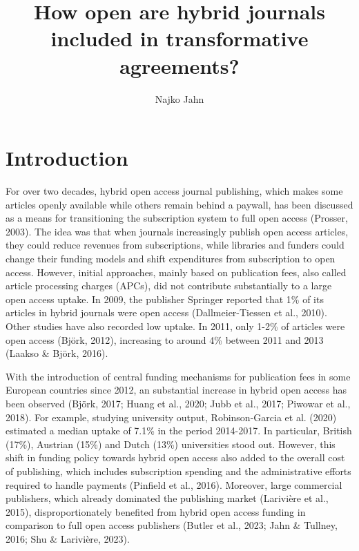 \documentclass[a4paper,man,floatsintext,longtable,noextraspace,12pt]{apa6}
\title{\textbf{How open are hybrid journals included in transformative agreements?}}
\author{Najko Jahn}
\affiliation{Göttingen State and University Library, University of Göttingen\\
Platz der Göttinger Sieben 1, 37073 Göttingen, Germany\\
najko.jahn@sub.uni-goettingen.de
}
\begin{document}
\maketitle

\setcounter{secnumdepth}{2}

\hypertarget{introduction}{%
\section{Introduction}\label{introduction}}

For over two decades, hybrid open access journal publishing, which makes
some articles openly available while others remain behind a paywall, has
been discussed as a means for transitioning the subscription system to
full open access (Prosser, 2003). The idea was that when journals
increasingly publish open access articles, they could reduce revenues
from subscriptions, while libraries and funders could change their
funding models and shift expenditures from subscription to open access.
However, initial approaches, mainly based on publication fees, also
called article processing charges (APCs), did not contribute
substantially to a large open access uptake. In 2009, the publisher
Springer reported that 1\% of its articles in hybrid journals were open
access (Dallmeier-Tiessen et al., 2010). Other studies have also
recorded low uptake. In 2011, only 1-2\% of articles were open access
(Björk, 2012), increasing to around 4\% between 2011 and 2013 (Laakso \&
Björk, 2016).

With the introduction of central funding mechanisms for publication fees
in some European countries since 2012, an substantial increase in hybrid
open access has been observed (Björk, 2017; Huang et al., 2020; Jubb et
al., 2017; Piwowar et al., 2018). For example, studying university
output, Robinson-Garcia et al. (2020) estimated a median uptake of 7.1\%
in the period 2014-2017. In particular, British (17\%), Austrian (15\%)
and Dutch (13\%) universities stood out. However, this shift in funding
policy towards hybrid open access also added to the overall cost of
publishing, which includes subscription spending and the administrative
efforts required to handle payments (Pinfield et al., 2016). Moreover,
large commercial publishers, which already dominated the publishing
market (Larivière et al., 2015), disproportionately benefited from
hybrid open access funding in comparison to full open access publishers
(Butler et al., 2023; Jahn \& Tullney, 2016; Shu \& Larivière, 2023).
\end{document}
